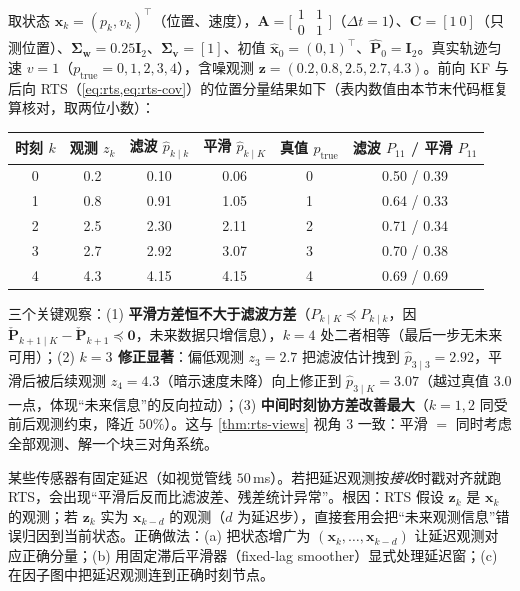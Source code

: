 \begin{example}\label{ex:rts-1d}
取状态 $\mathbf{x}_k=(p_k,v_k)^\top$（位置、速度），$\mathbf{A}=\big[\begin{smallmatrix}1&1\\0&1\end{smallmatrix}\big]$（$\Delta t=1$）、$\mathbf{C}=[1\ 0]$（只测位置）、$\boldsymbol{\Sigma}_{\mathbf{w}}=0.25\mathbf{I}_2$、$\boldsymbol{\Sigma}_{\mathbf{v}}=[1]$、初值 $\hat{\mathbf{x}}_{0}=(0,1)^\top$、$\hat{\mathbf{P}}_0=\mathbf{I}_2$。真实轨迹匀速 $v=1$（$p_{\text{true}}=0,1,2,3,4$），含噪观测 $\mathbf{z}=(0.2,0.8,2.5,2.7,4.3)$。前向 KF 与后向 RTS（\cref{eq:rts,eq:rts-cov}）的位置分量结果如下（表内数值由本节末代码框复算核对，取两位小数）：

\begin{center}\small
\begin{tabular}{cccccc}
\toprule
时刻 $k$ & 观测 $z_k$ & 滤波 $\hat{p}_{k\mid k}$ & 平滑 $\hat{p}_{k\mid K}$ & 真值 $p_{\text{true}}$ & 滤波 $P_{11}$ / 平滑 $P_{11}$ \\
\midrule
0 & 0.2 & 0.10 & 0.06 & 0 & 0.50 / 0.39 \\
1 & 0.8 & 0.91 & 1.05 & 1 & 0.64 / 0.33 \\
2 & 2.5 & 2.30 & 2.11 & 2 & 0.71 / 0.34 \\
3 & 2.7 & 2.92 & 3.07 & 3 & 0.70 / 0.38 \\
4 & 4.3 & 4.15 & 4.15 & 4 & 0.69 / 0.69 \\
\bottomrule
\end{tabular}
\end{center}

\noindent 三个关键观察：(1) \textbf{平滑方差恒不大于滤波方差}（$P_{k\mid K}\preceq P_{k\mid k}$，因 $\check{\mathbf{P}}_{k+1\mid K}-\check{\mathbf{P}}_{k+1}\preceq\mathbf{0}$，未来数据只增信息），$k=4$ 处二者相等（最后一步无未来可用）；(2) \textbf{$k=3$ 修正显著}：偏低观测 $z_3=2.7$ 把滤波估计拽到 $\hat{p}_{3\mid3}=2.92$，平滑后被后续观测 $z_4=4.3$（暗示速度未降）向上修正到 $\hat{p}_{3\mid K}=3.07$（越过真值 $3.0$ 一点，体现“未来信息”的反向拉动）；(3) \textbf{中间时刻协方差改善最大}（$k=1,2$ 同受前后观测约束，降近 $50\%$）。这与 \cref{thm:rts-views} 视角 3 一致：平滑 $=$ 同时考虑全部观测、解一个块三对角系统。
\end{example}

\begin{pitfall}
某些传感器有固定延迟（如视觉管线 $50$\,ms）。若把延迟观测按\emph{接收}时戳对齐就跑 RTS，会出现“平滑后反而比滤波差、残差统计异常”。根因：RTS 假设 $\mathbf{z}_k$ 是 $\mathbf{x}_k$ 的观测；若 $\mathbf{z}_k$ 实为 $\mathbf{x}_{k-d}$ 的观测（$d$ 为延迟步），直接套用会把“未来观测信息”错误归因到当前状态。正确做法：(a) 把状态增广为 $(\mathbf{x}_k,\dots,\mathbf{x}_{k-d})$ 让延迟观测对应正确分量；(b) 用固定滞后平滑器（fixed-lag smoother）显式处理延迟窗；(c) 在因子图中把延迟观测连到正确时刻节点。
\end{pitfall}

